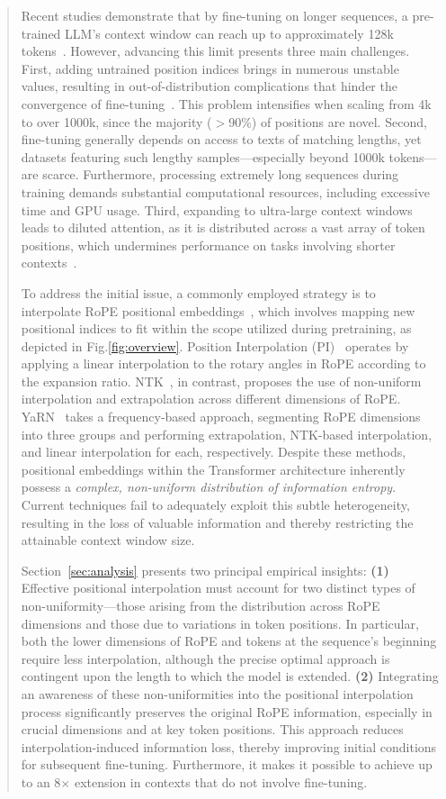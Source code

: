 \begin{abstract}
Recent studies demonstrate that by fine-tuning on longer sequences, a pre-trained LLM's context window can reach up to approximately 128k tokens~\cite{longlora,pi,yarn,zhang2024soaring,liu2023scaling}. However, advancing this limit presents three main challenges. First, adding untrained position indices brings in numerous unstable values, resulting in out-of-distribution complications that hinder the convergence of fine-tuning~\cite{pi}. This problem intensifies when scaling from 4k to over 1000k, since the majority ($>$90\%) of positions are novel. Second, fine-tuning generally depends on access to texts of matching lengths, yet datasets featuring such lengthy samples—especially beyond 1000k tokens—are scarce. Furthermore, processing extremely long sequences during training demands substantial computational resources, including excessive time and GPU usage. Third, expanding to ultra-large context windows leads to diluted attention, as it is distributed across a vast array of token positions, which undermines performance on tasks involving shorter contexts~\cite{pi}.

To address the initial issue, a commonly employed strategy is to interpolate RoPE positional embeddings~\cite{rope,pi}, which involves mapping new positional indices to fit within the scope utilized during pretraining, as depicted in Fig.\ref{fig:overview}. Position Interpolation (PI)~\cite{pi} operates by applying a linear interpolation to the rotary angles in RoPE according to the expansion ratio. NTK~\cite{ntk,dynamicntk}, in contrast, proposes the use of non-uniform interpolation and extrapolation across different dimensions of RoPE. YaRN~\cite{yarn} takes a frequency-based approach, segmenting RoPE dimensions into three groups and performing extrapolation, NTK-based interpolation, and linear interpolation for each, respectively. Despite these methods, positional embeddings within the Transformer architecture inherently possess a \emph{complex, non-uniform distribution of information entropy}. Current techniques fail to adequately exploit this subtle heterogeneity, resulting in the loss of valuable information and thereby restricting the attainable context window size.

Section~\ref{sec:analysis} presents two principal empirical insights: \textbf{(1)} Effective positional interpolation must account for two distinct types of non-uniformity—those arising from the distribution across RoPE dimensions and those due to variations in token positions. In particular, both the lower dimensions of RoPE and tokens at the sequence's beginning require less interpolation, although the precise optimal approach is contingent upon the length to which the model is extended. 
\textbf{(2)} Integrating an awareness of these non-uniformities into the positional interpolation process significantly preserves the original RoPE information, especially in crucial dimensions and at key token positions. This approach reduces interpolation-induced information loss, thereby improving initial conditions for subsequent fine-tuning. Furthermore, it makes it possible to achieve up to an 8$\times$ extension in contexts that do not involve fine-tuning.


\end{abstract}
